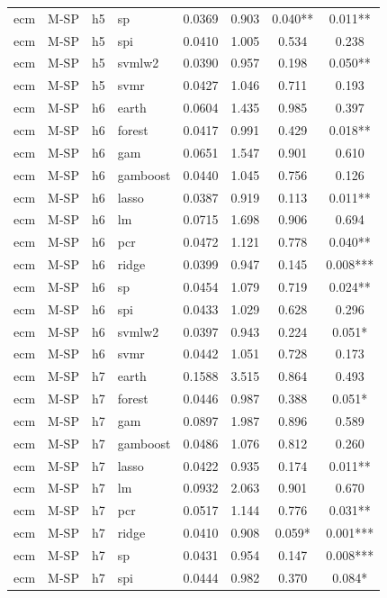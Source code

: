 \begin{ThreePartTable}
\begin{longtable}[t]{llclcccc}
ecm & M-SP & h5 & sp & 0.0369 & 0.903 & 0.040** & 0.011**\\
ecm & M-SP & h5 & spi & 0.0410 & 1.005 & 0.534 & 0.238\\
ecm & M-SP & h5 & svmlw2 & 0.0390 & 0.957 & 0.198 & 0.050**\\
ecm & M-SP & h5 & svmr & 0.0427 & 1.046 & 0.711 & 0.193\\
\addlinespace
ecm & M-SP & h6 & earth & 0.0604 & 1.435 & 0.985 & 0.397\\
ecm & M-SP & h6 & forest & 0.0417 & 0.991 & 0.429 & 0.018**\\
ecm & M-SP & h6 & gam & 0.0651 & 1.547 & 0.901 & 0.610\\
ecm & M-SP & h6 & gamboost & 0.0440 & 1.045 & 0.756 & 0.126\\
ecm & M-SP & h6 & lasso & 0.0387 & 0.919 & 0.113 & 0.011**\\
ecm & M-SP & h6 & lm & 0.0715 & 1.698 & 0.906 & 0.694\\
ecm & M-SP & h6 & pcr & 0.0472 & 1.121 & 0.778 & 0.040**\\
ecm & M-SP & h6 & ridge & 0.0399 & 0.947 & 0.145 & 0.008***\\
ecm & M-SP & h6 & sp & 0.0454 & 1.079 & 0.719 & 0.024**\\
ecm & M-SP & h6 & spi & 0.0433 & 1.029 & 0.628 & 0.296\\
ecm & M-SP & h6 & svmlw2 & 0.0397 & 0.943 & 0.224 & 0.051*\\
ecm & M-SP & h6 & svmr & 0.0442 & 1.051 & 0.728 & 0.173\\
\addlinespace
ecm & M-SP & h7 & earth & 0.1588 & 3.515 & 0.864 & 0.493\\
ecm & M-SP & h7 & forest & 0.0446 & 0.987 & 0.388 & 0.051*\\
ecm & M-SP & h7 & gam & 0.0897 & 1.987 & 0.896 & 0.589\\
ecm & M-SP & h7 & gamboost & 0.0486 & 1.076 & 0.812 & 0.260\\
ecm & M-SP & h7 & lasso & 0.0422 & 0.935 & 0.174 & 0.011**\\
ecm & M-SP & h7 & lm & 0.0932 & 2.063 & 0.901 & 0.670\\
ecm & M-SP & h7 & pcr & 0.0517 & 1.144 & 0.776 & 0.031**\\
ecm & M-SP & h7 & ridge & 0.0410 & 0.908 & 0.059* & 0.001***\\
ecm & M-SP & h7 & sp & 0.0431 & 0.954 & 0.147 & 0.008***\\
ecm & M-SP & h7 & spi & 0.0444 & 0.982 & 0.370 & 0.084*\\

\end{longtable}
\end{ThreePartTable}
